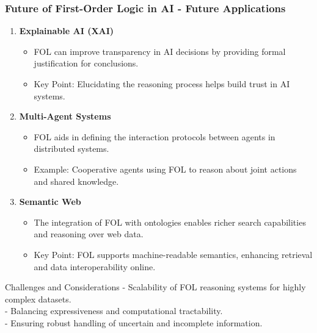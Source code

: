 \documentclass[aspectratio=169]{beamer}
\begin{document}
\begin{frame}[fragile]
    \frametitle{Future of First-Order Logic in AI - Future Applications}
    \begin{enumerate}
        \item \textbf{Explainable AI (XAI)}
            \begin{itemize}
                \item FOL can improve transparency in AI decisions by providing formal justification for conclusions.
                \item Key Point: Elucidating the reasoning process helps build trust in AI systems.
            \end{itemize}
        \item \textbf{Multi-Agent Systems}
            \begin{itemize}
                \item FOL aids in defining the interaction protocols between agents in distributed systems.
                \item Example: Cooperative agents using FOL to reason about joint actions and shared knowledge.
            \end{itemize}
        \item \textbf{Semantic Web}
            \begin{itemize}
                \item The integration of FOL with ontologies enables richer search capabilities and reasoning over web data.
                \item Key Point: FOL supports machine-readable semantics, enhancing retrieval and data interoperability online.
            \end{itemize}
    \end{enumerate}
    \begin{block}{Challenges and Considerations}
        - Scalability of FOL reasoning systems for highly complex datasets.\\
        - Balancing expressiveness and computational tractability.\\
        - Ensuring robust handling of uncertain and incomplete information.
    \end{block}
\end{frame}
\end{document}
